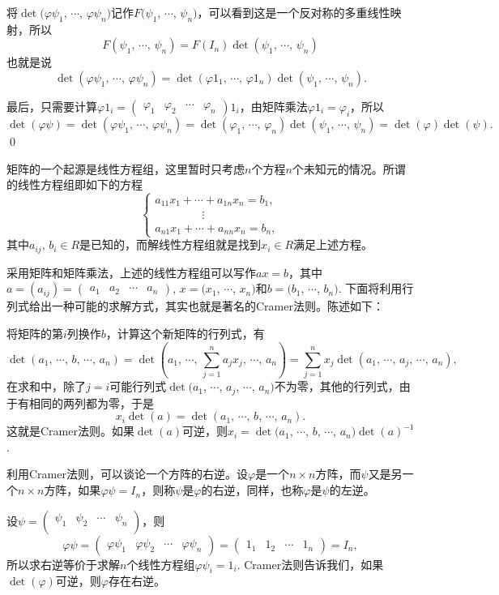 	将$\det(\varphi\psi_{1}$, $\cdots$, $\varphi\psi_{n})$记作$F(\psi_{1}$, $\cdots$, $\psi_{n})$，可以看到这是一个反对称的多重线性映射，所以
	\[
	F(\psi_{1},\,\cdots\!,\,\psi_{n})=F(I_n)\det (\psi_{1},\,\cdots\!,\,\psi_{n})
	\]
	也就是说
	\[
	\det (\varphi\psi_{1},\,\cdots\!,\,\varphi\psi_{n})=\det(\varphi 1_1,\,\cdots\!,\,\varphi 1_n)\det(\psi_{1},\,\cdots\!,\,\psi_{n}).
	\]

	最后，只需要计算$\varphi 1_i=\begin{pmatrix}\varphi_{1} & \varphi_{2} & \cdots & \varphi_{n}\end{pmatrix}1_i$，由矩阵乘法$\varphi 1_i=\varphi_i$，所以
	\[
	\det(\varphi\psi)=\det(\varphi\psi_{1},\,\cdots\!,\,\varphi\psi_{n})=\det(\varphi_1,\,\cdots\!,\,\varphi_n)\det(\psi_{1},\,\cdots\!,\,\psi_{n})=\det(\varphi)\det(\psi).
	\]
\qed

\para 矩阵的一个起源是线性方程组，这里暂时只考虑$n$个方程$n$个未知元的情况。所谓的线性方程组即如下的方程
\[
	\begin{cases}
	a_{11}x_1+\cdots+a_{1n}x_n=b_1,\\
	\qquad\qquad\,\vdots\\
	a_{n1}x_1+\cdots+a_{nn}x_n=b_n,
	\end{cases}
\]
其中$a_{ij}$, $b_i\in R$是已知的，而解线性方程组就是找到$x_i\in R$满足上述方程。

采用矩阵和矩阵乘法，上述的线性方程组可以写作$ax=b$，其中$a=(a_{ij})=\begin{pmatrix}a_{1} & a_{2} & \cdots & a_{n}\end{pmatrix}$, $x=(x_1$, $\cdots$, $x_n)$和$b=(b_1$, $\cdots$, $b_n)$. 下面将利用行列式给出一种可能的求解方式，其实也就是著名的Cramer法则。陈述如下：

将矩阵的第$i$列换作$b$，计算这个新矩阵的行列式，有
\[
	\det(a_1,\,\cdots\!,\,b,\,\cdots\!,\,a_n)=\det\left(a_1,\,\cdots\!,\,\sum_{j=1}^na_j x_j,\,\cdots\!,\,a_n\right)=\sum_{j=1}^n x_j \det(a_1,\,\cdots\!,\,a_j,\,\cdots\!,\,a_n),
\]
在求和中，除了$j=i$可能行列式$\det(a_1$, $\cdots$, $a_j$, $\cdots$, $a_n)$不为零，其他的行列式，由于有相同的两列都为零，于是
\[
	x_i \det(a)=\det(a_1,\,\cdots\!,\,b,\,\cdots\!,\,a_n).
\]
这就是Cramer法则。如果$\det(a)$可逆，则$x_i=\det(a_1$, $\cdots$, $b$, $\cdots$, $a_n)\det(a)^{-1}$.

\para 利用Cramer法则，可以谈论一个方阵的右逆。设$\varphi$是一个$n\times n$方阵，而$\psi$又是另一个$n\times n$方阵，如果$\varphi\psi=I_n$，则称$\psi$是$\varphi$的右逆，同样，也称$\varphi$是$\psi$的左逆。

设$\psi=\begin{pmatrix}\psi_{1} & \psi_{2} & \cdots & \psi_{n}\\\end{pmatrix}$，则
\[
	\varphi\psi=\begin{pmatrix}\varphi\psi_{1} & \varphi\psi_{2} & \cdots & \varphi\psi_{n}\end{pmatrix}=\begin{pmatrix}1_{1} & 1_{2} & \cdots & 1_{n}\end{pmatrix}=I_n,
\]
所以求右逆等价于求解$n$个线性方程组$\varphi\psi_i=1_i$. Cramer法则告诉我们，如果$\det(\varphi)$可逆，则$\varphi$存在右逆。

